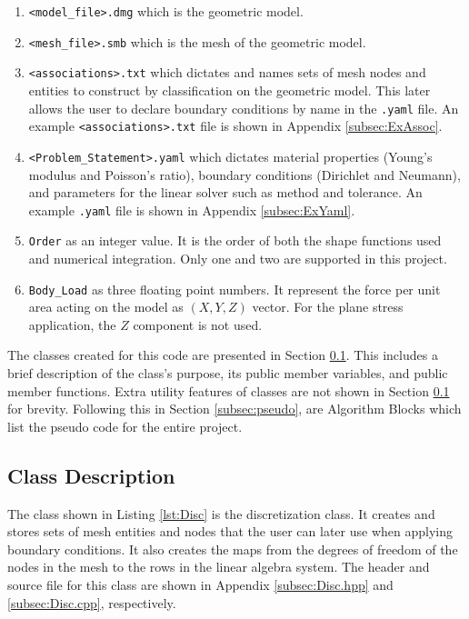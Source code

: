 \documentclass[a4paper, 12pt]{article}
\begin{document}
\begin{enumerate}
  \item \texttt{<model\_file>.dmg} which is the geometric model.
  \item \texttt{<mesh\_file>.smb} which is the mesh of the 
        geometric model.
  \item \texttt{<associations>.txt} which dictates and names sets of
        mesh nodes and entities to construct by classification on the
        geometric model. This later allows the user to declare 
        boundary conditions by name in the \texttt{.yaml} file.
        An example \texttt{<associations>.txt} file is shown in
        Appendix \ref{subsec:ExAssoc}.
  \item \texttt{<Problem\_Statement>.yaml} which dictates material
        properties (Young's modulus and Poisson's ratio),
        boundary conditions (Dirichlet and Neumann), and parameters
        for the linear solver such as method and tolerance. An
        example \texttt{.yaml} file is shown in Appendix \ref{subsec:ExYaml}.
  \item \texttt{Order} as an integer value. It is the order of 
        both the shape functions used and numerical integration. 
        Only one and two are supported in this project.
  \item \texttt{Body\_Load} as three floating point numbers.
        It represent the force per unit area acting on the model
        as $(X, Y, Z)$ vector. For the plane stress application,
        the $Z$ component is not used.
\end{enumerate}

\noindent
The classes created for this code are presented 
in Section \ref{subsec:class}.
This includes a brief description of the class's purpose,
its public member variables, and public member functions. 
Extra utility features of classes are not shown in 
Section \ref{subsec:class} for brevity.  Following this in 
Section \ref{subsec:pseudo}, are Algorithm Blocks which list the 
pseudo code for the entire project.

\subsection{Class Description} \label{subsec:class}
The class shown in Listing \ref{lst:Disc} is the discretization 
class. It creates and stores sets of mesh entities and nodes that the user
can later use when applying boundary conditions. It also 
creates the maps from the degrees of freedom of the nodes 
in the mesh to the rows in the linear algebra system.
The header and source file for this class are shown in
Appendix \ref{subsec:Disc.hpp} and \ref{subsec:Disc.cpp}, 
respectively.
\end{document}
